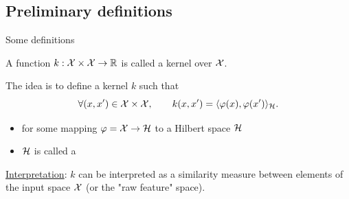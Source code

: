 \documentclass[xcolor={usenames,dvipsnames}]{beamer}
\begin{document}
%
%

\subsection{Preliminary definitions}

\begin{frame}{Some definitions}
\begin{definition}[Kernel]
A function $k :{\mathcal{X}} \times{\mathcal{X}} \to \mathbb{R}$ is called a kernel over ${\mathcal{X}}$.
\end{definition}

The idea is to define a kernel $k$ such that  
$$\forall (x,x') \in {\mathcal{X}} \times {\mathcal{X}}, \qquad 
k(x,x') = \langle \varphi (x ) , \varphi(x') \rangle_{\mathcal{H}}.
$$
\begin{itemize}
\item for some mapping $\varphi = {\mathcal{X}} \to \mathcal{H}$ to a Hilbert space $\mathcal{H}$ 

\vspace{.2cm}

\item  $\mathcal{H}$ is called a 
\end{itemize}
\pause
\underline{Interpretation}: $k$ can be interpreted as a similarity measure between elements of the input space ${\mathcal{X}}$ (or the "raw feature" space).
\end{frame}
\end{document}
